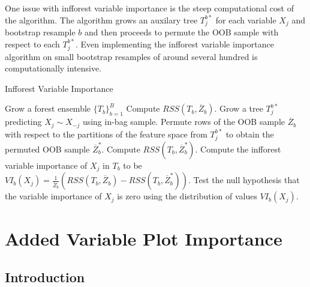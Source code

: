 \documentclass[12pt,twoside]{reedthesis}
\theoremstyle{definition}
\theoremstyle{definition}
\theoremstyle{definition}
\theoremstyle{remark}
\begin{document}
One issue with infforest variable importance is the steep computational
cost of the algorithm. The algorithm grows an auxilary tree
\(T_{j}^{b*}\) for each variable \(X_j\) and bootstrap resample \(b\)
and then proceeds to permute the OOB sample with respect to each
\(T_j^{b*}\). Even implementing the infforest variable importance
algorithm on small bootstrap resamples of around several hundred is
computationally intensive. \par
\begin{algorithm}
    \caption{Infforest Variable Importance} \label{infforest variable importance}
      \begin{algorithmic}[1]
        \State Grow a forest ensemble $\{T_b\}_{b=1}^B$
              \State Compute $RSS(T_b,\overline{Z}_b)$.
              \State Grow a tree $T_j^{b*}$ predicting $X_j\sim X_{-j}$ using in-bag sample.
              \State Permute rows of the OOB sample $\overline{Z}_b$ with respect to the partitions of the feature space from $T_j^{b*}$ to obtain the permuted OOB sample $\overline{Z}_b^*$. 
              \State Compute $RSS(T_b,\overline{Z}_b^*)$.
              \State Compute the infforest variable importance of $X_j$ in $T_b$ to be $VI_b(X_j)=\frac{1}{\overline{Z}_b}\left(RSS(T_b,\overline{Z}_b)-RSS(T_b,\overline{Z}_b^*)\right)$.  
            \EndFor
            \State Test the null hypothesis that the variable importance of $X_j$ is zero using the distribution of values $VI_b(X_j)$. 
          \EndFor
      \end{algorithmic}
  \end{algorithm}
\chapter{Added Variable Plot
Importance}\label{added-variable-plot-importance}

\section{Introduction}\label{introduction-2}
\end{document}
